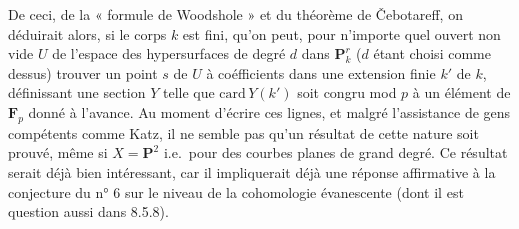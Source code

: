\documentclass[11pt,a4paper]{article}
\begin{document}

De ceci, de la « formule de Woodshole » \struck{\ill{}} et du théorème de
Čebotareff, on déduirait alors, si le corps $k$ est fini, qu'on peut, pour
n'importe quel ouvert non vide $U$ de l'espace des hypersurfaces de degré $d$
dans $\mathbf{P}^{r}_{k}$ ($d$ étant choisi comme dessus) trouver un point $s$
de $U$ à coéfficients dans une extension finie $k'$ de $k$, définissant une
section $Y$ telle que $\mathrm{card}\, Y(k')$ soit congru mod $p$ à un élément
de $\mathbf{F}_{p}$ donné à l'avance. Au moment d'écrire ces lignes, et malgré
l'assistance de gens compétents comme Katz, il ne semble pas qu'un résultat de
cette nature soit prouvé, même si $X = \mathbf{P}^{2}$ \supplied{(}i.e.\ pour des courbes planes  de grand degré\supplied{)}.
Ce résultat serait déjà bien intéressant, car il impliquerait déjà une
réponse affirmative à la conjecture du n° 6 sur le niveau de la cohomologie
évanescente (dont il est question aussi dans 8.5.8).
\end{document}
